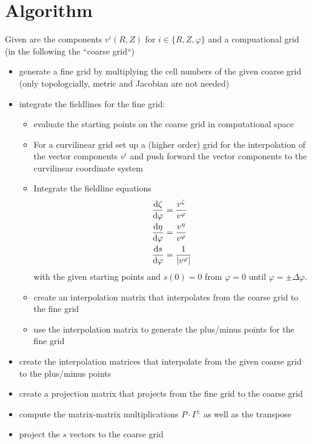 \section{Algorithm}
Given are the components $v^i(R,Z)$ for $i\in\{R,Z,\varphi\}$ and a compuational grid (in the following the ``coarse grid``)
\begin{itemize}
  \item generate a fine grid by multiplying the cell numbers of the given coarse grid (only topologcially, metric and Jacobian are not needed)
  \item integrate the fieldlines for the fine grid:
    \begin{itemize}
      \item evaluate the starting points on the coarse grid in computational space 
      \item For a curvilinear grid set up a (higher order) grid for the 
        interpolation of the vector components $v^i$ and push forward the vector components
        to the curvilinear coordinate system
      \item Integrate the fieldline equations 
\begin{subequations}
\begin{align}
\frac{\mathrm{d} \zeta}{\mathrm{d}\varphi} &= \frac{v^\zeta}{v^\varphi}\\
\frac{\mathrm{d} \eta}{\mathrm{d}\varphi} &= \frac{v^\eta}{v^\varphi}\\
\frac{\mathrm{d} s}{\mathrm{d}\varphi} &= \frac{1}{|v^\varphi|}
\end{align}
\label{eq:fieldlines_converted}
\end{subequations}
    with the given starting points and $s(0)=0$ from $\varphi=0$ until $\varphi = \pm\Delta \varphi$.
      \item create an interpolation matrix that interpolates from the coarse grid 
        to the fine grid
      \item use the interpolation matrix to generate the plus/minus points for the fine grid
    \end{itemize}
  \item create the interpolation matrices that interpolate from the given coarse grid 
    to the plus/minus points 
  \item create a projection matrix that projects from the fine grid to the coarse grid
  \item compute the matrix-matrix multiplications $P\cdot I^\pm$ as well as the transpose
  \item project the $s$ vectors to the coarse grid
\end{itemize}
